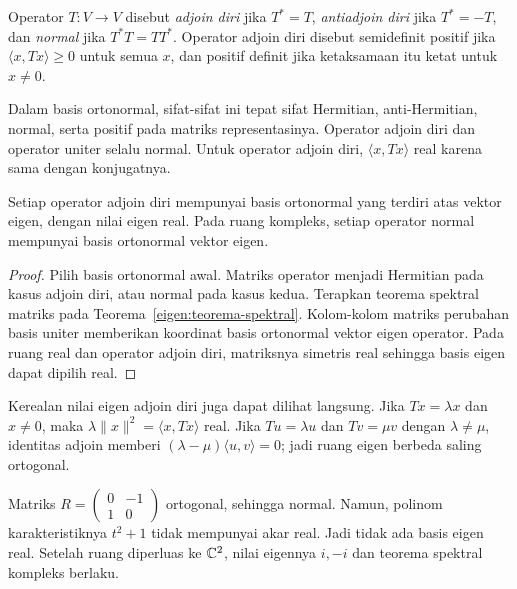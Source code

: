 \begin{definisi}
    Operator $T:V\to V$ disebut \emph{adjoin diri} jika $T^*=T$,
    \emph{antiadjoin diri} jika $T^*=-T$, dan \emph{normal}
    jika $T^*T=TT^*$.
    Operator adjoin diri disebut semidefinit positif jika
    $\langle x,Tx\rangle\ge0$ untuk semua $x$, dan positif definit
    jika ketaksamaan itu ketat untuk $x\ne0$.
\end{definisi}

Dalam basis ortonormal, sifat-sifat ini tepat sifat Hermitian,
anti-Hermitian, normal, serta positif pada matriks representasinya.
Operator adjoin diri dan operator uniter selalu normal.
Untuk operator adjoin diri, $\langle x,Tx\rangle$ real karena
sama dengan konjugatnya.

\begin{teorema}
    Setiap operator adjoin diri mempunyai basis ortonormal
    yang terdiri atas vektor eigen, dengan nilai eigen real.
    Pada ruang kompleks, setiap operator normal mempunyai
    basis ortonormal vektor eigen.
\end{teorema}
\begin{proof}
    Pilih basis ortonormal awal. Matriks operator menjadi
    Hermitian pada kasus adjoin diri, atau normal pada kasus kedua.
    Terapkan teorema spektral matriks pada
    Teorema~\ref{eigen:teorema-spektral}.
    Kolom-kolom matriks perubahan basis uniter memberikan
    koordinat basis ortonormal vektor eigen operator.
    Pada ruang real dan operator adjoin diri, matriksnya simetris
    real sehingga basis eigen dapat dipilih real.
\end{proof}

Kerealan nilai eigen adjoin diri juga dapat dilihat langsung.
Jika $Tx=\lambda x$ dan $x\ne0$, maka
$\lambda\|x\|^2=\langle x,Tx\rangle$ real.
Jika $Tu=\lambda u$ dan $Tv=\mu v$ dengan $\lambda\ne\mu$,
identitas adjoin memberi $(\lambda-\mu)\langle u,v\rangle=0$;
jadi ruang eigen berbeda saling ortogonal.

\begin{exam}
    Matriks $R=\begin{pmatrix}0&-1\\1&0\end{pmatrix}$ ortogonal,
    sehingga normal. Namun, polinom karakteristiknya $t^2+1$
    tidak mempunyai akar real. Jadi tidak ada basis eigen real.
    Setelah ruang diperluas ke $\mathbb{C}^2$, nilai eigennya $i,-i$
    dan teorema spektral kompleks berlaku.
\end{exam}

